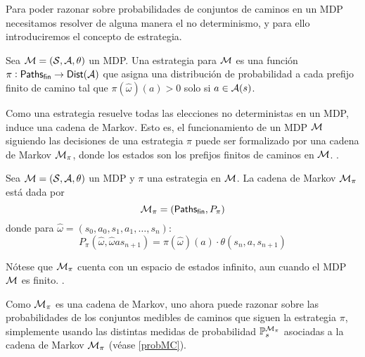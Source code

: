 Para poder razonar sobre probabilidades de conjuntos de caminos en un MDP
necesitamos resolver de alguna manera el no determinismo, y para ello
introduciremos el concepto de estrategia.

\begin{definition}
	Sea $\mathcal{M} = (\mathcal{S}, \mathcal{A}, \theta)$ un MDP. Una estrategia para $\mathcal{M}$ es una función $\pi: \textsf{Paths}_\textsf{fin} \rightarrow \mathsf{Dist} (\mathcal{A})$ que asigna una distribución de probabilidad a cada prefijo finito de camino tal que $\pi(\hat \omega) (a) > 0$ solo si $a \in \mathcal{A}(s)$.
\end{definition}


Como una estrategia resuelve todas las elecciones no deterministas en un MDP,
induce una cadena de Markov. Esto es, el funcionamiento de un MDP $\mathcal{M}$
siguiendo las decisiones de una estrategia $\pi$ puede ser formalizado por una
cadena de Markov $\mathcal{M}_\pi$, donde los estados son los prefijos finitos de
caminos en $\mathcal{M}$. .

\begin{definition}
	Sea $\mathcal{M} = (\mathcal{S}, \mathcal{A}, \theta)$ un MDP y $\pi$ una estrategia en $\mathcal{M}$. La cadena de Markov $\mathcal{M}_\pi$ está dada por
	$$\mathcal{M}_\pi = (\textsf{Paths}_\textsf{fin}, P_\pi)$$
	donde para $\hat \omega = (s_0, a_0, s_1, a_1, \dots, s_n)$:
	$$P_\pi(\hat \omega, \hat \omega a s_{n+1}) = \pi(\hat \omega)(a) \cdot \theta(s_n, a, s_{n+1})$$
\end{definition}

Nótese que $\mathcal{M}_\pi$ cuenta con un espacio de estados infinito, aun cuando el
MDP $\mathcal{M}$ es finito. .

Como $\mathcal{M}_\pi$ es una cadena de Markov, uno ahora puede razonar sobre las
probabilidades de los conjuntos medibles de caminos que siguen la estrategia
$\pi$, simplemente usando las distintas medidas de probabilidad
$\mathbb{P}^{\mathcal{M}_\pi}_s$ asociadas a la cadena de Markov $\mathcal{M}_\pi$ (véase
\ref{probMC}).

